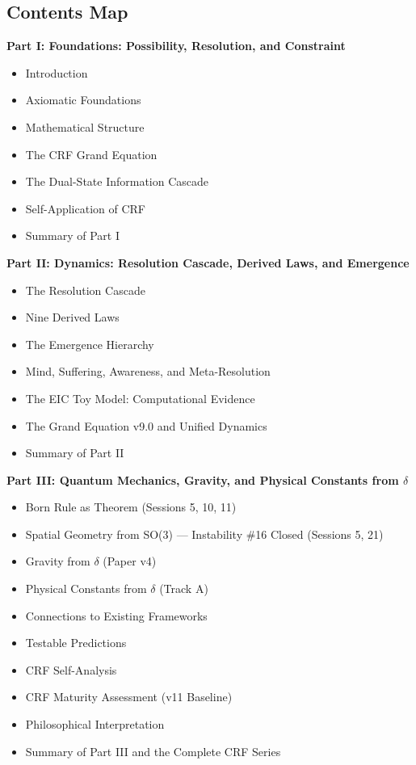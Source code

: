 \documentclass[11pt, a4paper]{article}
\begin{document}
\subsection*{Contents Map}

\begin{contentsbox}[title={Part A --- Part and Section Headers}]
\textbf{Part I: Foundations: Possibility, Resolution, and Constraint}
\begin{itemize}[noitemsep,leftmargin=1.5em]
  \item Introduction
  \item Axiomatic Foundations
  \item Mathematical Structure
  \item The CRF Grand Equation
  \item The Dual-State Information Cascade
  \item Self-Application of CRF
  \item Summary of Part I
\end{itemize}

\textbf{Part II: Dynamics: Resolution Cascade, Derived Laws, and Emergence}
\begin{itemize}[noitemsep,leftmargin=1.5em]
  \item The Resolution Cascade
  \item Nine Derived Laws
  \item The Emergence Hierarchy
  \item Mind, Suffering, Awareness, and Meta-Resolution
  \item The EIC Toy Model: Computational Evidence
  \item The Grand Equation v9.0 and Unified Dynamics
  \item Summary of Part II
\end{itemize}

\textbf{Part III: Quantum Mechanics, Gravity, and Physical Constants from $\delta$}
\begin{itemize}[noitemsep,leftmargin=1.5em]
  \item Born Rule as Theorem (Sessions 5, 10, 11)
  \item Spatial Geometry from SO(3) --- Instability \#16 Closed (Sessions 5, 21)
  \item Gravity from $\delta$ (Paper v4)
  \item Physical Constants from $\delta$ (Track A)
  \item Connections to Existing Frameworks
  \item Testable Predictions
  \item CRF Self-Analysis
  \item CRF Maturity Assessment (v11 Baseline)
  \item Philosophical Interpretation
  \item Summary of Part III and the Complete CRF Series
\end{itemize}


\end{contentsbox}
\end{document}

